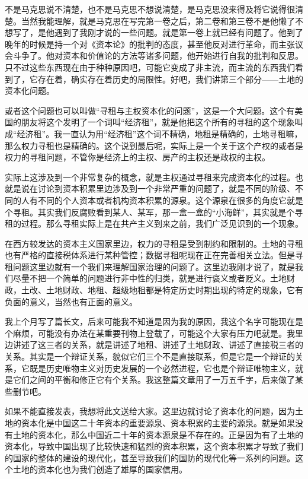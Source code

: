 \documentclass[UTF8, 12pt, a4paper]{ctexrep}
\begin{document}
不是马克思说不清楚，也不是马克思不想说清楚，是马克思没来得及将它说得很清楚。当然我能理解，就是马克思在写完第一卷之后，第二卷和第三卷不是他懒了不想写了，是他遇到了我刚才说的一些问题。就是第一卷上就已经有问题了。他到了晚年的时候是持一个对《资本论》的批判的态度，甚至他反对进行革命，而主张议会斗争了。他对资本和价值论的方法等诸多问题，他开始进行自我的批判和反思。只不过这些东西现在由于种种原因吧，可能它变成了非主流，而主流的东西我们看到了，它存在着，确实存在着历史的局限性。好吧，我们讲第三个部分——土地的资本化问题。

或者这个问题也可以叫做“寻租与主权资本化的问题”，这是一个大问题。这个有美国的朋友将这个发明了一个词叫“经济租”，就是他把这个所有的寻租的这个现象叫成“经济租”。我一直认为用“经济租”这个词不精确，地租是精确的，土地寻租嘛，那么权力寻租也是精确的。这个说到最后呢，实际上是一个关于这个产权的或者是权力的寻租问题，不管你是经济上的主权、房产的主权还是政权的主权。

实际上这涉及到一个非常复杂的概念，就是主权通过寻租来完成资本化的过程。也就是说在讨论到资本积累里边涉及到一个非常严重的问题了，就是不同的阶级、不同的人有不同的个人资本或者机构资本积累的源泉。这个源泉在很多的角度它就是个寻租。其实我们反腐败看到某人、某军，那一盒一盒的“小海鲜”，其实就是个寻租的过程。那么寻租实际上是在共产主义到来之前，我们广泛见识到的一个现象。

在西方较发达的资本主义国家里边，权力的寻租是受到制约和限制的。土地的寻租也有严格的直接税体系进行某种管控；数据寻租呢现在正在完善相关立法。但是寻租问题这里边就有一个我们来理解国家治理的问题了。这里边我刚才说了，就是我们尽量不把一个简单的问题进行非中性的归类，就是进行褒义或者贬义。土地财政，土改、土地财政、地租、超级地租都是特定历史时期出现的特定的现象，它有负面的意义，当然也有正面的意义。

我上个月写了篇长文，后来可能我不知道是因为我的原因，我这个名字可能现在是个麻烦，可能没有办法在某重要刊物上登载了，可能这个大家有压力吧就是。我里边讲述了这三者的关系，就是讲述了地租、讲述了土地财政、讲述了直接税三者的关系。其实是一个辩证关系，貌似它们三个不是直接联系，但是它是一个辩证的关系，它既是历史唯物主义对历史发展的一个必然进程，它也是个辩证唯物主义，就是它们之间的平衡和修正它有个关系。我这整篇文章用了一万五千字，后来做了某些删节吧。

如果不能直接发表，我想将此文送给大家。这里边就讨论了资本化的问题，因为土地的资本化是中国这二十年资本的重要源泉、资本积累的主要的源泉。就是如果没有土地的资本化，那么中国近二十年的资本源泉是不存在的。正是因为有了土地的资本化，导致中国出现了比较快速和猛烈的资本积累，这个资本积累才导致了我们的国家的整体的建设的现代化，甚至导致我们的国防的现代化等一系列的问题。这个土地的资本化也为我们创造了雄厚的国家信用。
\end{document}
